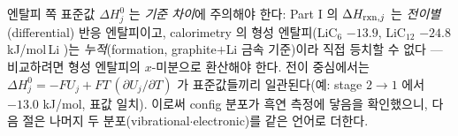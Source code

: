 엔탈피 쪽 표준값 $\Delta H^0_j$ 는 \emph{기준 차이}에 주의해야 한다: Part I 의 $\Delta H_{\mathrm{rxn},j}$ 는
\emph{전이별}(differential) 반응 엔탈피이고, calorimetry 의 형성 엔탈피(LiC$_6$ $-13.9$, LiC$_{12}$ $-24.8$
kJ/mol\,Li \cite{chemmater2015})는 \emph{누적}(formation, graphite$+$Li 금속 기준)이라 직접 등치할 수 없다 ---
비교하려면 형성 엔탈피의 $x$-미분으로 환산해야 한다. 전이 중심에서는 $\Delta H^0_j=-FU_j+FT\,(\partial
U_j/\partial T)$ 가 표준값들끼리 일관된다(예: stage $2\to1$ 에서 $-13.0$ kJ/mol, 표값 일치). 이로써 config
분포가 흑연 측정에 닿음을 확인했으니, 다음 절은 나머지 두 분포(vibrational$\cdot$electronic)를 같은 언어로
더한다.

